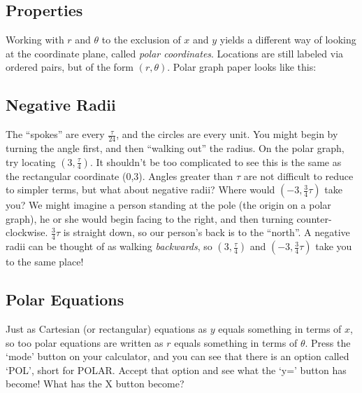\subsection{Properties}
Working with $r$ and $\theta$ to the exclusion of $x$ and $y$ yields a different way of looking
at the coordinate plane, called \emph{polar coordinates}.  Locations are still labeled via ordered
pairs, but of the form $(r,\theta)$.  Polar graph paper looks like this:


\subsection{Negative Radii}
The ``spokes'' are every $\frac{\tau}{24}$, and the circles are every unit.  You might begin by turning
the angle first, and then ``walking out'' the radius.  On the polar graph, try locating $(3,\frac{\tau}{4})$.
It shouldn't be too complicated to see this is the same as the rectangular coordinate (0,3).  Angles
greater than $\tau$ are not difficult to reduce to simpler terms, but what about negative radii?  
Where would $(-3,\frac{3}{4}\tau)$ take you?  We might imagine a person standing at the
pole (the origin on a polar graph), he or she would begin facing to the right, and then turning 
counter-clockwise.  $\frac{3}{4}\tau$ is straight down, so our person's back is to the ``north''.  A
negative radii can be thought of as walking \emph{backwards}, so $(3,\frac{\tau}{4})$ and
$(-3,\frac{3}{4}\tau)$ take you to the same place!


\subsection{Polar Equations}
Just as Cartesian (or rectangular) equations as $y$ equals something in terms of $x$, so
too polar equations are written as $r$ equals something in terms of $\theta$.  Press the `mode'
button on your calculator, and you can see that there is an option called `POL', short for POLAR.
Accept that option and see what the `y=' button has become!  What has the X button become?


